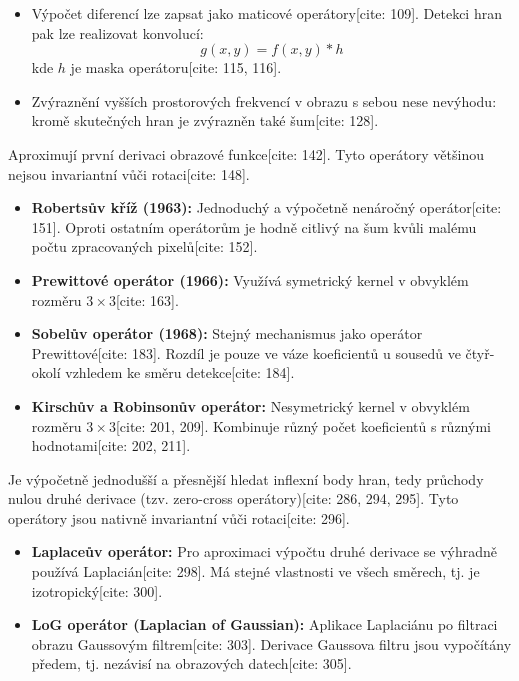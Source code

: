 \begin{itemize}
    \item Výpočet diferencí lze zapsat jako maticové operátory[cite: 109]. Detekci hran pak lze realizovat konvolucí:
    \begin{equation}
        g(x,y) = f(x,y) * h
    \end{equation}
    kde $h$ je maska operátoru[cite: 115, 116].
    \item Zvýraznění vyšších prostorových frekvencí v obrazu s sebou nese nevýhodu: kromě skutečných hran je zvýrazněn také šum[cite: 128].
\end{itemize}
Aproximují první derivaci obrazové funkce[cite: 142]. Tyto operátory většinou nejsou invariantní vůči rotaci[cite: 148].
\begin{itemize}
    \item \textbf{Robertsův kříž (1963):} Jednoduchý a výpočetně nenáročný operátor[cite: 151]. Oproti ostatním operátorům je hodně citlivý na šum kvůli malému počtu zpracovaných pixelů[cite: 152].
    \item \textbf{Prewittové operátor (1966):} Využívá symetrický kernel v obvyklém rozměru $3 \times 3$[cite: 163].
    \item \textbf{Sobelův operátor (1968):} Stejný mechanismus jako operátor Prewittové[cite: 183]. Rozdíl je pouze ve váze koeficientů u sousedů ve čtyř-okolí vzhledem ke směru detekce[cite: 184].
    \item \textbf{Kirschův a Robinsonův operátor:} Nesymetrický kernel v obvyklém rozměru $3 \times 3$[cite: 201, 209]. Kombinuje různý počet koeficientů s různými hodnotami[cite: 202, 211].
\end{itemize}
Je výpočetně jednodušší a přesnější hledat inflexní body hran, tedy průchody nulou druhé derivace (tzv. zero-cross operátory)[cite: 286, 294, 295]. Tyto operátory jsou nativně invariantní vůči rotaci[cite: 296].
\begin{itemize}
    \item \textbf{Laplaceův operátor:} Pro aproximaci výpočtu druhé derivace se výhradně používá Laplacián[cite: 298]. Má stejné vlastnosti ve všech směrech, tj. je izotropický[cite: 300].
    \item \textbf{LoG operátor (Laplacian of Gaussian):} Aplikace Laplaciánu po filtraci obrazu Gaussovým filtrem[cite: 303]. Derivace Gaussova filtru jsou vypočítány předem, tj. nezávisí na obrazových datech[cite: 305].
\end{itemize}
